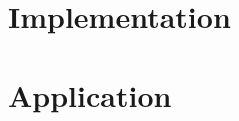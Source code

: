 \documentclass[sigconf,preprint]{acmart}
\begin{document}




% 

%















\section{Implementation}






























\section{Application}









% 









%
\end{document}
